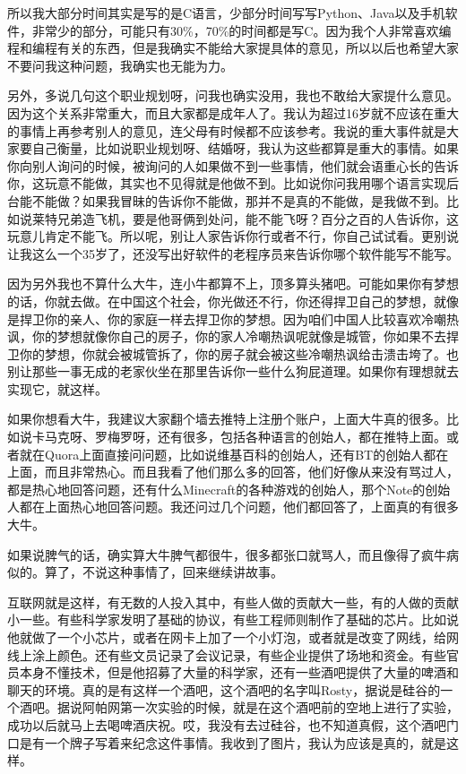 \documentclass[
  letterpaper,
  DIV=11,
  numbers=noendperiod]{scrreprt}
\begin{document}
所以我大部分时间其实是写的是C语言，少部分时间写写Python、Java以及手机软件，非常少的部分，可能只有30\%，70\%的时间都是写C。因为我个人非常喜欢编程和编程有关的东西，但是我确实不能给大家提具体的意见，所以以后也希望大家不要问我这种问题，我确实也无能为力。

另外，多说几句这个职业规划呀，问我也确实没用，我也不敢给大家提什么意见。因为这个关系非常重大，而且大家都是成年人了。我认为超过16岁就不应该在重大的事情上再参考别人的意见，连父母有时候都不应该参考。我说的重大事件就是大家要自己衡量，比如说职业规划呀、结婚呀，我认为这些都算是重大的事情。如果你向别人询问的时候，被询问的人如果做不到一些事情，他们就会语重心长的告诉你，这玩意不能做，其实也不见得就是他做不到。比如说你问我用哪个语言实现后台能不能做？如果我冒昧的告诉你不能做，那并不是真的不能做，是我做不到。比如说莱特兄弟造飞机，要是他哥俩到处问，能不能飞呀？百分之百的人告诉你，这玩意儿肯定不能飞。所以呢，别让人家告诉你行或者不行，你自己试试看。更别说让我这么一个35岁了，还没写出好软件的老程序员来告诉你哪个软件能写不能写。

因为另外我也不算什么大牛，连小牛都算不上，顶多算头猪吧。可能如果你有梦想的话，你就去做。在中国这个社会，你光做还不行，你还得捍卫自己的梦想，就像是捍卫你的亲人、你的家庭一样去捍卫你的梦想。因为咱们中国人比较喜欢冷嘲热讽，你的梦想就像你自己的房子，你的家人冷嘲热讽呢就像是城管，你如果不去捍卫你的梦想，你就会被城管拆了，你的房子就会被这些冷嘲热讽给击溃击垮了。也别让那些一事无成的老家伙坐在那里告诉你一些什么狗屁道理。如果你有理想就去实现它，就这样。

如果你想看大牛，我建议大家翻个墙去推特上注册个账户，上面大牛真的很多。比如说卡马克呀、罗梅罗呀，还有很多，包括各种语言的创始人，都在推特上面。或者就在Quora上面直接问问题，比如说维基百科的创始人，还有BT的创始人都在上面，而且非常热心。而且我看了他们那么多的回答，他们好像从来没有骂过人，都是热心地回答问题，还有什么Minecraft的各种游戏的创始人，那个Note的创始人都在上面热心地回答问题。我还问过几个问题，他们都回答了，上面真的有很多大牛。

如果说脾气的话，确实算大牛脾气都很牛，很多都张口就骂人，而且像得了疯牛病似的。算了，不说这种事情了，回来继续讲故事。

互联网就是这样，有无数的人投入其中，有些人做的贡献大一些，有的人做的贡献小一些。有些科学家发明了基础的协议，有些工程师则制作了基础的芯片。比如说他就做了一个小芯片，或者在网卡上加了一个小灯泡，或者就是改变了网线，给网线上涂上颜色。还有些文员记录了会议记录，有些企业提供了场地和资金。有些官员本身不懂技术，但是他招募了大量的科学家，还有一些酒吧提供了大量的啤酒和聊天的环境。真的是有这样一个酒吧，这个酒吧的名字叫Rosty，据说是硅谷的一个酒吧。据说阿帕网第一次实验的时候，就是在这个酒吧前的空地上进行了实验，成功以后就马上去喝啤酒庆祝。哎，我没有去过硅谷，也不知道真假，这个酒吧门口是有一个牌子写着来纪念这件事情。我收到了图片，我认为应该是真的，就是这样。
\end{document}
